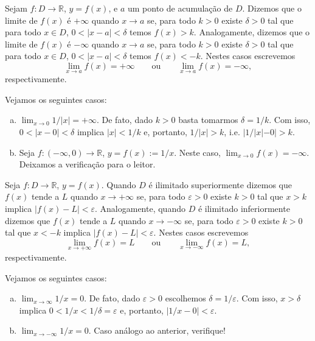 \begin{defn}\label{defn:limite_infinito}
  Sejam $f:D\to\mathbb{R}$, $y=f(x)$, e $a$ um ponto de acumulação de $D$. Dizemos que o limite de $f(x)$ é $+\infty$ quando $x\to a$ se, para todo $k>0$ existe $\delta>0$ tal que para todo $x\in D$, $0<|x-a|<\delta$ temos $f(x)>k$. Analogamente, dizemos que o limite de $f(x)$ é $-\infty$ quando $x\to a$ se, para todo $k>0$ existe $\delta>0$ tal que para todo $x\in D$, $0<|x-a|<\delta$ temos $f(x)<-k$. Nestes casos escrevemos
  \begin{equation}
    \lim_{x\to a} f(x)=+\infty \qquad\text{ou}\qquad \lim_{x\to a} f(x)=-\infty,
  \end{equation}
respectivamente.
\end{defn}

\begin{ex}
  Vejamos os seguintes casos:
  \begin{enumerate}[a)]
  \item $\lim_{x\to 0} 1/|x| = +\infty$. De fato, dado $k>0$ basta tomarmos $\delta = 1/k$. Com isso, $0<|x-0|<\delta$ implica $|x|<1/k$ e, portanto, $1/|x|>k$, i.e. $|1/|x|-0|>k$.
  \item Seja $f:(-\infty, 0)\to\mathbb{R}$, $y=f(x):=1/x$. Neste caso, $\lim_{x\to 0} f(x) = -\infty$. Deixamos a verificação para o leitor.
  \end{enumerate}
\end{ex}

\begin{defn}\label{defn:limite_no_infinito}
  Seja $f:D\to\mathbb{R}$, $y=f(x)$. Quando $D$ é ilimitado superiormente dizemos que $f(x)$ tende a $L$ quando $x\to +\infty$ se, para todo $\varepsilon>0$ existe $k>0$ tal que $x>k$ implica $|f(x)-L|<\varepsilon$. Analogamente, quando $D$ é ilimitado inferiormente dizemos que $f(x)$ tende a $L$ quando $x\to -\infty$ se, para todo $\varepsilon>0$ existe $k>0$ tal que $x<-k$ implica $|f(x)-L|<\varepsilon$. Nestes casos escrevemos
  \begin{equation}
    \lim_{x\to +\infty} f(x) = L \qquad\text{ou}\qquad \lim_{x\to -\infty} f(x) = L,
  \end{equation}
respectivamente.
\end{defn}

\begin{ex}
  Vejamos os seguintes casos:
  \begin{enumerate}[a)]
  \item $\lim_{x\to \infty} 1/x = 0$. De fato, dado $\varepsilon>0$ escolhemos $\delta=1/\varepsilon$. Com isso, $x>\delta$ implica $0<1/x<1/\delta=\varepsilon$ e, portanto, $|1/x-0|<\varepsilon$.
  \item $\lim_{x\to -\infty} 1/x = 0$. Caso análogo ao anterior, verifique!
  \end{enumerate}
\end{ex}

